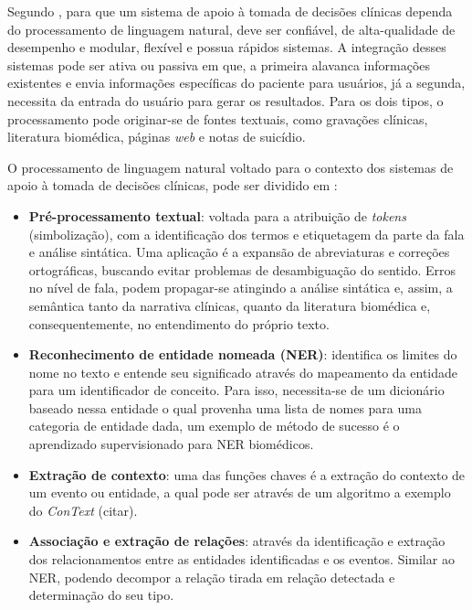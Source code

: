 \documentclass[12pt]{article}
\begin{document}
Segundo \cite{what_can_nlp_cdss}, para que um sistema de apoio à tomada de decisões clínicas dependa do processamento de linguagem natural, deve ser confiável, de alta-qualidade de desempenho e modular, flexível e possua rápidos sistemas. A integração desses sistemas pode ser ativa ou passiva em que, a primeira alavanca informações existentes e envia informações específicas do paciente para usuários, já a segunda, necessita da entrada do usuário para gerar os resultados. Para os dois tipos, o processamento pode originar-se de fontes textuais, como gravações clínicas, literatura biomédica, páginas \textit{web} e notas de suicídio.

O processamento de linguagem natural voltado para o contexto dos sistemas de apoio à tomada de decisões clínicas, pode ser dividido em \cite{what_can_nlp_cdss}:

\begin{itemize}
    \item \textbf{Pré-processamento textual}: voltada para a atribuição de \textit{tokens} (simbolização), com a identificação dos termos e etiquetagem da parte da fala e análise sintática. Uma aplicação é a expansão de abreviaturas e correções ortográficas, buscando evitar problemas de desambiguação do sentido. Erros no nível de fala, podem propagar-se atingindo a análise sintática e, assim, a semântica tanto da narrativa clínicas, quanto da literatura biomédica e, consequentemente, no entendimento do próprio texto.
    
    \item \textbf{Reconhecimento de entidade nomeada (NER)}: identifica os limites do nome no texto e entende seu significado através do mapeamento da entidade para um identificador de conceito. Para isso, necessita-se de um dicionário baseado nessa entidade o qual provenha uma lista de nomes para uma categoria de entidade dada, um exemplo de método de sucesso é o aprendizado supervisionado para NER biomédicos.
    
    \item \textbf{Extração de contexto}: uma das funções chaves é a extração do contexto de um evento ou entidade, a qual pode ser através de um algoritmo a exemplo do \textit{ConText} (citar).
    
    \item \textbf{Associação e extração de relações}: através da identificação e extração dos relacionamentos entre as entidades identificadas e os eventos. Similar ao NER, podendo decompor a relação tirada em relação detectada e determinação do seu tipo.

\end{itemize}
\end{document}
